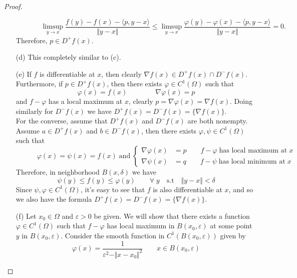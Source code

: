 \documentclass[12pt, oneside]{amsart}  	%
\begin{document}
\begin{proof}
\begin{itemize}
\begin{equation*}
\quad\;\;\qquad \limsup_{y\longrightarrow x} \frac{f(y) - f(x) - \langle p,y-x\rangle}{\Vert y-x\Vert} \leq \limsup_{y\longrightarrow x} \frac{\varphi(y) - \varphi(x) - \langle p,y-x\rangle}{\Vert y-x\Vert} = 0.
\end{equation*}
Therefore, $p\in D^+f(x)$.
\item[(d)] This completely similar to (c).
\item[(e)] If $f$ is differentiable at $x$, then clearly $\nabla f(x) \in D^+f(x)\cap D^-f(x)$. Furthermore, if $p\in D^+f(x)$, then there exists $\varphi\in C^1(\Omega)$ such that
\begin{equation*}
\varphi(x) = f(x) \qquad\qquad \nabla \varphi(x) = p
\end{equation*}
and $f-\varphi$ has a local maximum at $x$, clearly $p = \nabla \varphi(x) = \nabla f(x)$. Doing similarly for $D^-f(x)$ we have $D^+f(x) = D^-f(x) = \{\nabla f(x) \}$.\\
For the converse, assume that $D^+f(x)$ and $D^-f(x)$ are both nonempty. Assume $a\in D^+f(x)$ and $b\in D^-f(x)$, then there exists $\varphi,\psi\in C^1(\Omega)$ such that
\begin{equation*}
\qquad\quad \varphi(x) = \psi(x) = f(x) \;\text{and}\; \begin{cases}
\nabla \varphi(x) &= p\qquad f- \varphi\;\text{has local maximum at}\;x\\
\nabla \psi(x) &= q \qquad f- \psi\;\text{has local minimum at}\;x
\end{cases}
\end{equation*}
Therefore, in neighborhood $B(x,\delta)$ we have
\begin{equation*}
\psi(y) \leq f(y) \leq \varphi(y) \qquad\forall\;y\quad\text{s.t}\quad \Vert y-x\Vert < \delta
\end{equation*}
Since $\psi, \varphi\in C^1(\Omega)$, it's easy to see that $f$ is also differentiable at $x$, and so we also have the formula $D^+f(x) = D^-f(x) = \{\nabla f(x) \}$.
\item[(f)] Let $x_0\in \Omega$ and $\varepsilon>0$ be given. We will show that there exists a function $\varphi\in C^1(\Omega)$ such that $f-\varphi$ has local maximum in $B(x_0,\varepsilon)$ at some point $y$ in $B(x_0,\varepsilon)$. Consider the smooth function in $C^1(B(x_0,\varepsilon))$ given by
\begin{equation*}
\varphi(x) = \frac{1}{\varepsilon^2 - \Vert x-x_0\Vert^2} \qquad x\in B(x_0,\varepsilon)
\end{equation*}

\end{itemize}
\end{proof}
\end{document}
